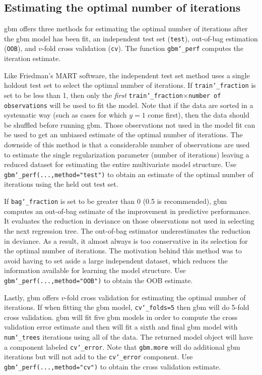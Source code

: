 \documentclass{article}
\begin{document}
\subsection{Estimating the optimal number of iterations}

gbm offers three methods for estimating the optimal number of
iterations after the gbm model has been fit, an independent test set
(\texttt{test}), out-of-bag estimation (\texttt{OOB}), and $v$-fold
cross validation (\texttt{cv}). The function \texttt{gbm\char`_perf}
computes the iteration estimate.

Like Friedman's MART software, the independent test set method uses a
single holdout test set to select the optimal number of iterations. If
\texttt{train\char`_fraction} is set to be less than 1, then only the
\textit{first} \texttt{train\char`_fraction}$\times$\texttt{number of observations} will
be used to fit the model. Note that if the data are sorted in a
systematic way (such as cases for which $y=1$ come first), then the
data should be shuffled before running gbm. Those observations not
used in the model fit can be used to get an unbiased estimate of the
optimal number of iterations. The downside of this method is that a
considerable number of observations are used to estimate the single
regularization parameter (number of iterations) leaving a reduced
dataset for estimating the entire multivariate model structure. Use
\texttt{gbm\char`_perf(...,method="test")} to obtain an estimate of the
optimal number of iterations using the held out test set.

If \texttt{bag\char`_fraction} is set to be greater than 0 (0.5 is
recommended), gbm computes an out-of-bag estimate of the improvement
in predictive performance. It evaluates the reduction in deviance on
those observations not used in selecting the next regression tree. The
out-of-bag estimator underestimates the reduction in deviance. As a
result, it almost always is too conservative in its selection for the
optimal number of iterations. The motivation behind this method was to
avoid having to set aside a large independent dataset, which reduces
the information available for learning the model structure. Use
\texttt{gbm\char`_perf(...,method="OOB")} to obtain the OOB estimate.

Lastly, gbm offers $v$-fold cross validation for estimating the
optimal number of iterations. If when fitting the gbm model,
\texttt{cv\char`_folds=5} then gbm will do 5-fold cross validation. gbm will
fit five gbm models in order to compute the cross validation error
estimate and then will fit a sixth and final gbm model with
\texttt{num\char`_trees} iterations using all of the data. The returned model
object will have a component labeled \texttt{cv\char`_error}. Note that
\texttt{gbm.more} will do additional gbm iterations but will not add
to the \texttt{cv\char`_error} component. Use
\texttt{gbm\char`_perf(...,method="cv")} to obtain the cross validation
estimate.
\end{document}
